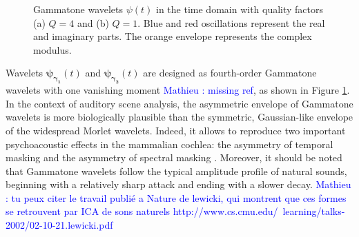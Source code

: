 \documentclass[journal]{IEEEtran}
\newcommand{\ml}[1]{\textcolor{blue}{ Mathieu : #1}}
\begin{document}
\begin{figure}
\begin{center}
\caption{
\label{fig:gammatones}
Gammatone wavelets $\psi(t)$ in the time domain with quality factors (a) $Q = 4$ and (b) $Q = 1$. Blue and red oscillations represent the real and imaginary parts. The orange envelope represents the complex modulus.}
\end{center}
\end{figure}

Wavelets
$\boldsymbol{\psi_{\gamma_1}}(t)$ and $\boldsymbol{\psi_{\gamma_2}}(t)$ are designed as fourth-order Gammatone
wavelets with one vanishing moment \cite{Venkitaraman2014} \ml{missing ref}, as shown in Figure \ref{fig:gammatones}.
In the context of auditory scene analysis, the asymmetric envelope of Gammatone wavelets is more biologically plausible than the symmetric, Gaussian-like envelope of the widespread Morlet wavelets.
Indeed, it allows to reproduce two important psychoacoustic effects in the mammalian cochlea: the asymmetry of temporal masking and the asymmetry of spectral masking \cite{Fastl2007}.
Moreover, it should be noted that Gammatone wavelets follow the typical amplitude profile of natural sounds, beginning with a relatively sharp attack and ending with a slower decay. \ml{tu peux citer le travail publié a Nature de lewicki, qui montrent que ces formes se retrouvent par ICA de sons naturels http://www.cs.cmu.edu/~learning/talks-2002/02-10-21.lewicki.pdf}
\end{document}
